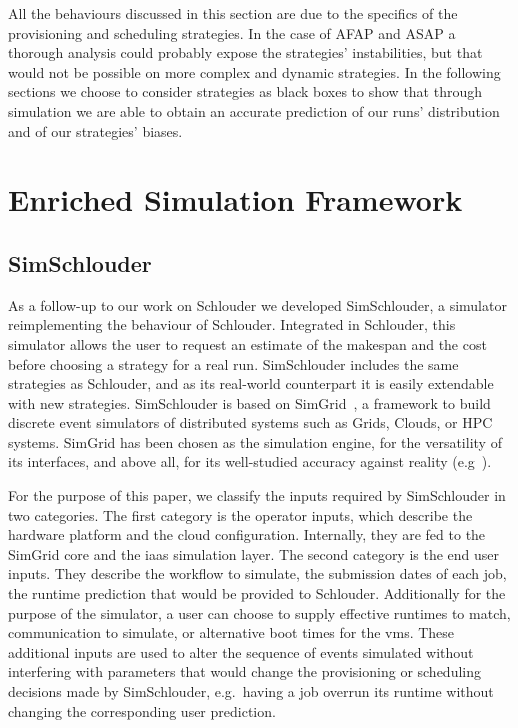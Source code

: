 \documentclass[10pt,conference,compsocconf]{IEEEtran}
\begin{document}
All the behaviours discussed in this section are due to the specifics of the
provisioning and scheduling strategies. In the case of AFAP and ASAP a thorough
analysis could probably expose the strategies' instabilities, but that would not
be possible on more complex and dynamic strategies. In the following sections we
choose to consider strategies as black boxes to show that through simulation 
we are able  to obtain an accurate prediction of our runs' distribution
and of our strategies' biases.

\section{Enriched Simulation Framework}
\label{sec:enriched-sim}

\subsection{SimSchlouder}

As a follow-up to our work on Schlouder we developed SimSchlouder, a simulator
reimplementing the behaviour of Schlouder. Integrated in Schlouder, this
simulator allows the user to request an estimate of the makespan and the cost
before choosing a strategy for a real run. SimSchlouder includes the same
strategies as Schlouder, and as its real-world counterpart it is easily
extendable with new strategies. SimSchlouder is based on SimGrid~\cite{simgrid},
a framework to build discrete event simulators of distributed systems such as
Grids, Clouds, or HPC systems. SimGrid has been chosen as the simulation engine,
for the versatility of its interfaces, and above all, for its well-studied
accuracy against reality (e.g~\cite{StanisicTLVM15,VelhoSCL13}).


For the purpose of this paper, we classify the inputs required by SimSchlouder
in two categories. The first category is the operator inputs, which describe the
hardware platform and the cloud configuration. Internally, they are fed to the
SimGrid core and the \ac{iaas} simulation layer. The second category is the end
user inputs. They describe the workflow to simulate, the submission dates of
each job, the runtime prediction that would be provided to Schlouder.
Additionally for the purpose of the simulator, a user can choose to supply
effective runtimes to match, communication to simulate, or alternative boot
times for the \acp{vm}. These additional inputs are used to alter the sequence
of events simulated without interfering with parameters that would change the
provisioning or scheduling decisions made by SimSchlouder, e.g.\ having a job
overrun its runtime without changing the corresponding user prediction.
\end{document}
